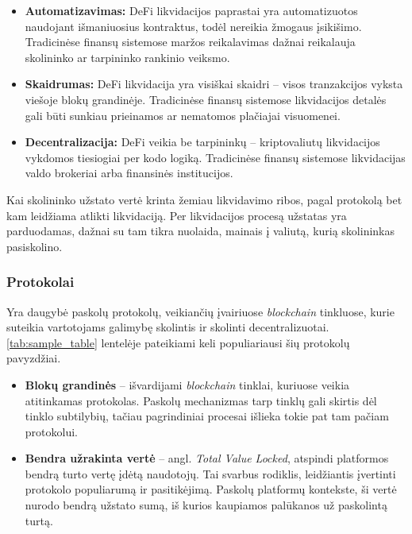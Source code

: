 \documentclass[]{VUMIFTemplateClass}
\begin{document}
\begin{itemize}
    \item \textbf{Automatizavimas:} DeFi likvidacijos paprastai yra automatizuotos naudojant išmaniuosius kontraktus, todėl nereikia žmogaus įsikišimo. Tradicinėse finansų sistemose maržos reikalavimas dažnai reikalauja skolininko ar tarpininko rankinio veiksmo.
    
    \item \textbf{Skaidrumas:} DeFi likvidacija yra visiškai skaidri – visos tranzakcijos vyksta viešoje blokų grandinėje. Tradicinėse finansų sistemose likvidacijos detalės gali būti sunkiau prieinamos ar nematomos plačiajai visuomenei.
    
    \item \textbf{Decentralizacija:} DeFi veikia be tarpininkų – kriptovaliutų likvidacijos vykdomos tiesiogiai per kodo logiką. Tradicinėse finansų sistemose likvidacijas valdo brokeriai arba finansinės institucijos.
\end{itemize}

Kai skolininko užstato vertė krinta žemiau likvidavimo ribos, pagal protokolą bet kam leidžiama atlikti likvidaciją. Per likvidacijos procesą užstatas yra parduodamas, dažnai su tam tikra nuolaida, mainais į valiutą, kurią skolininkas pasiskolino. \cite{venussavokosbendras}

\subsubsection{Protokolai}

Yra daugybė paskolų protokolų, veikiančių įvairiuose \textit{blockchain} tinkluose, kurie suteikia vartotojams galimybę skolintis ir skolinti decentralizuotai. \ref{tab:sample_table} lentelėje pateikiami keli populiariausi šių protokolų pavyzdžiai. 

\begin{itemize}
  \item \textbf{Blokų grandinės} – išvardijami \textit{blockchain} tinklai, kuriuose veikia atitinkamas protokolas. Paskolų mechanizmas tarp tinklų gali skirtis dėl tinklo subtilybių, tačiau pagrindiniai procesai išlieka tokie pat tam pačiam protokolui.
  \item \textbf{Bendra užrakinta vertė} – angl. \textit{Total Value Locked}, atspindi platformos bendrą turto vertę įdėtą naudotojų. Tai svarbus rodiklis, leidžiantis įvertinti protokolo populiarumą ir pasitikėjimą. Paskolų platformų kontekste, ši vertė nurodo bendrą užstato sumą, iš kurios kaupiamos palūkanos už paskolintą turtą.
  \end{itemize}
  
\end{document}
